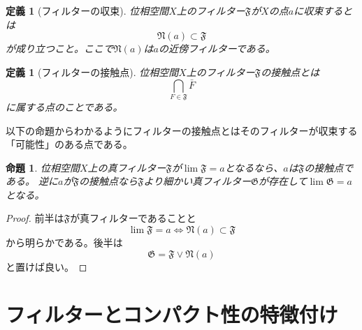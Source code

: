 \documentclass[leqno]{jsarticle}
\newtheorem{prop}[thm]{命題}
\newtheorem{df}[thm]{定義}
\newcommand{\ff}{\mathfrak{F}}
\newcommand{\GG}{\mathfrak{G}}
\begin{document}
\begin{df}[フィルターの収束]位相空間$X$上のフィルター$\ff$が$X$の点$a$に収束するとは
\[
\mathfrak{N}(a)\subset \ff
\]
が成り立つこと。ここで$\mathfrak{N}(a)$は$a$の近傍フィルターである。
\end{df}
\begin{df}[フィルターの接触点]
位相空間$X$上のフィルター$\ff$の接触点とは
\[
\bigcap_{F\in\ff}\bar{F}
\]
に属する点のことである。
\end{df}
以下の命題からわかるようにフィルターの接触点とはそのフィルターが収束する「可能性」のある点である。
\begin{prop}
位相空間$X$上の真フィルター$\ff$が$\lim\ff=a$となるなら、$a$は$\ff$の接触点である。
逆に$a$が$\ff$の接触点なら$\ff$より細かい真フィルター$\GG$が存在して$\lim\GG=a$となる。
\end{prop}
\begin{proof}
前半は$\ff$が真フィルターであることと
\[
\lim\ff=a\iff \mathfrak{N}(a)\subset \ff
\]
から明らかである。後半は
\[
\GG=\ff\vee \mathfrak{N}(a)
\]
と置けば良い。
\end{proof}
\section*{フィルターとコンパクト性の特徴付け}
\end{document}
